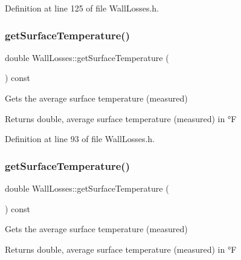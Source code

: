 Definition at line 125 of file Wall\+Losses.\+h.

\mbox{\label{class_wall_losses_ac2ce3cea6eef435a5fcf6a659b8e7d70}} 
\subsubsection{\texorpdfstring{get\+Surface\+Temperature()}{getSurfaceTemperature()}\hspace{0.1cm}{\footnotesize\ttfamily [1/3]}}
{\footnotesize\ttfamily double Wall\+Losses\+::get\+Surface\+Temperature (\begin{DoxyParamCaption}{ }\end{DoxyParamCaption}) const\hspace{0.3cm}{\ttfamily [inline]}}

Gets the average surface temperature (measured) \begin{DoxyReturn}{Returns}
double, average surface temperature (measured) in °F 
\end{DoxyReturn}


Definition at line 93 of file Wall\+Losses.\+h.

\mbox{\label{class_wall_losses_ac2ce3cea6eef435a5fcf6a659b8e7d70}} 
\subsubsection{\texorpdfstring{get\+Surface\+Temperature()}{getSurfaceTemperature()}\hspace{0.1cm}{\footnotesize\ttfamily [2/3]}}
{\footnotesize\ttfamily double Wall\+Losses\+::get\+Surface\+Temperature (\begin{DoxyParamCaption}{ }\end{DoxyParamCaption}) const\hspace{0.3cm}{\ttfamily [inline]}}

Gets the average surface temperature (measured) \begin{DoxyReturn}{Returns}
double, average surface temperature (measured) in °F 
\end{DoxyReturn}


